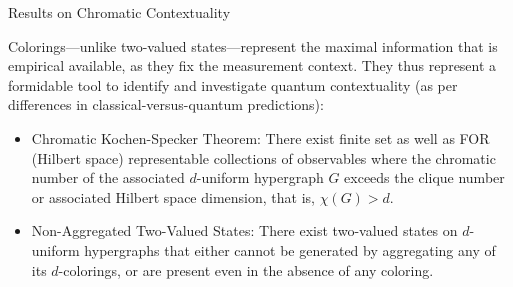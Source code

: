 \documentclass{beamer}
\begin{document}
\begin{frame}{Results on Chromatic Contextuality}

{Colorings---unlike two-valued states---represent the maximal information that is empirical available, as they fix the measurement context.
They thus represent a formidable tool to identify and investigate quantum contextuality
(as per differences in classical-versus-quantum predictions):}

    \begin{itemize}[<+->] %
        \item \alert{Chromatic Kochen-Specker Theorem:} There exist finite set as well as FOR (Hilbert space) representable collections of observables
where the chromatic number of the associated $d$-uniform hypergraph $G$ exceeds the
 clique number or associated Hilbert space dimension, that is, $\chi(G) > d$.

        \item \alert{Non-Aggregated Two-Valued States:} There exist  two-valued states   on $d$-uniform hypergraphs
       that either cannot be generated by aggregating any of its $d$-colorings,
       or are present even in the absence of any coloring.


    \end{itemize}
\end{frame}

\end{document}
